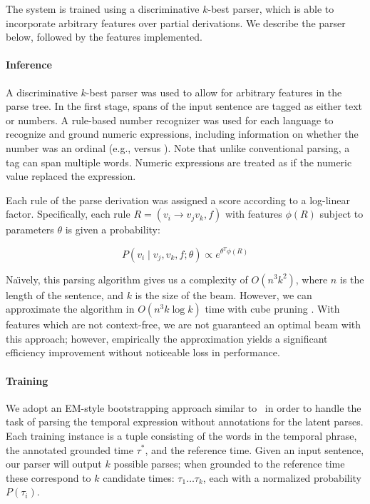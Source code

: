 The system is trained using a discriminative $k$-best parser, which is able to
  incorporate arbitrary features over partial derivations.
We describe the parser below, followed by the features implemented.

\paragraph{Inference}
A discriminative $k$-best parser was used to allow for arbitrary features
  in the parse tree.
In the first stage, spans of the input sentence are tagged as either text
  or numbers.
A rule-based number recognizer was used for each language to recognize and
  ground numeric expressions, including information on whether the number was
  an ordinal (e.g.,  versus ).
Note that unlike conventional parsing, a tag can span multiple words.
Numeric expressions are treated as if the numeric value replaced the
  expression.

Each rule of the parse derivation was assigned a score according to a log-linear
  factor.
Specifically, each rule $R = (v_i \rightarrow v_j v_k, f)$
  with features $\phi(R)$ subject to parameters
  $\theta$ is given a probability:

\begin{equation}
P(v_i \mid v_j, v_k, f; \theta) \propto e^{ \theta^T \phi(R) }
\end{equation}

Na\"{\i}vely, this parsing algorithm gives us a complexity of $O(n^3 k^2)$,
  where $n$ is the length of the sentence, and $k$ is the size of the beam.
However, we can approximate the algorithm in $O(n^3 k \log k)$ time with
  cube pruning \cite{key:2007chiang-cubepruning}.
With features which are not context-free, we are not
  guaranteed an optimal beam with this approach; however, empirically
  the approximation yields a significant efficiency improvement without
  noticeable loss in performance.

\paragraph{Training}
We adopt an EM-style bootstrapping approach similar to \me\ in order to handle
  the task of parsing the temporal expression without 
  annotations for the latent parses.
Each training instance is a tuple consisting of the words in the temporal
	phrase, the annotated grounded time $\tau^*$, and the reference time.
Given an input sentence, our parser will output $k$ possible parses; when
  grounded to the reference time these correspond to $k$ candidate times:
  $\tau_1 \dots \tau_k$, each with a normalized probability $P(\tau_i)$.

